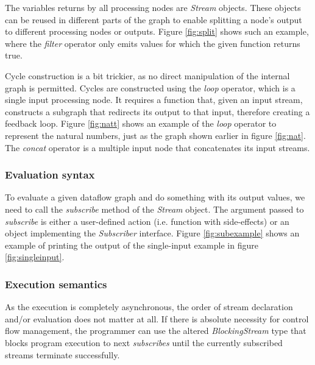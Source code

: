 \documentclass[sigplan,review,anonymous]{acmart}
\begin{document}

The variables returns by all processing nodes are \textit{Stream} objects. These
objects can be reused in different parts of the graph to enable splitting a
node's output to different processing nodes or outputs. Figure \ref{fig:split}
shows such an example, where the \textit{filter} operator only emits values for
which the given function returns true.


Cycle construction is a bit trickier, as no direct manipulation of the internal
graph is permitted. Cycles are constructed using the \textit{loop} operator,
which is a single input processing node. It requires a function that, given an
input stream, constructs a subgraph that redirects its output to that input,
therefore creating a feedback loop. Figure \ref{fig:natt} shows an example of
the \textit{loop} operator to represent the natural numbers, just as the graph
shown earlier in figure \ref{fig:nat}. The \textit{concat} operator is a
multiple input node that concatenates its input streams.


\subsubsection{Evaluation syntax}

To evaluate a given dataflow graph and do something with its output values, we
need to call the \textit{subscribe} method of the \textit{Stream} object. The
argument passed to \textit{subscribe} is either a user-defined action (i.e.
function with side-effects) or an object implementing the \textit{Subscriber}
interface. Figure \ref{fig:subexample} shows an
example of printing the output of the single-input example in figure
\ref{fig:singleinput}.


\subsubsection{Execution semantics}

As the execution is completely asynchronous, the order of stream declaration
and/or evaluation does not matter at all. If there is absolute necessity for
control flow management, the programmer can use the altered
\textit{BlockingStream} type that blocks program execution to next
\textit{subscribes} until the currently subscribed streams terminate
successfully.
\end{document}

